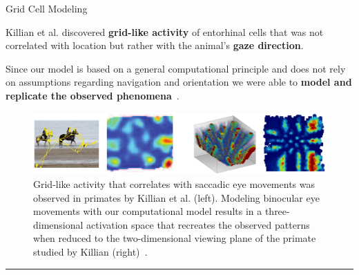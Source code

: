 


\begin{frame}{Grid Cell Modeling }

\justifying

\vspace{1.5em}
Killian et al. discovered {\bf grid-like activity} of entorhinal cells that was 
not correlated with location but rather with the animal's {\bf gaze direction}.

\vspace{1.5em}
Since our model is based on a general computational principle and does not rely
on assumptions regarding navigation and orientation we were able to
{\bf model and replicate the observed 
phenomena}~\cite{Kerdels2016a,Kerdels2019}.


\vspace{0.5em}

\begin{figure}
\includegraphics[width=0.9\linewidth]{diss/saccade_grids.jpg}

\vspace{-0.5em}
\caption{\justifying\scriptsize Grid-like activity that correlates with saccadic eye 
movements was observed in primates by Killian et al. (left). Modeling binocular
eye movements with our computational model results in a three-dimensional 
activation space that recreates the observed patterns when reduced to the 
two-dimensional viewing plane of the primate studied by Killian
(right)~\cite{Kerdels2016a,Kerdels2019}.}
\end{figure}

\vspace{-2em}

\begin{center}
\rule{2cm}{0.4pt}\\[0.5em]
\end{center}

\bestpaper\\[1em]

\end{frame}




